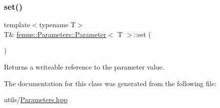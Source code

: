 \subsubsection{\texorpdfstring{set()}{set()}}
{\footnotesize\ttfamily template$<$typename T$>$ \\
T\& \mbox{\hyperlink{classfemus_1_1_parameters_1_1_parameter}{femus\+::\+Parameters\+::\+Parameter}}$<$ T $>$\+::set (\begin{DoxyParamCaption}{ }\end{DoxyParamCaption})\hspace{0.3cm}{\ttfamily [inline]}}

\begin{DoxyReturn}{Returns}
a writeable reference to the parameter value. 
\end{DoxyReturn}


The documentation for this class was generated from the following file\+:\begin{DoxyCompactItemize}
\item 
utils/\mbox{\hyperlink{_parameters_8hpp}{Parameters.\+hpp}}\end{DoxyCompactItemize}
